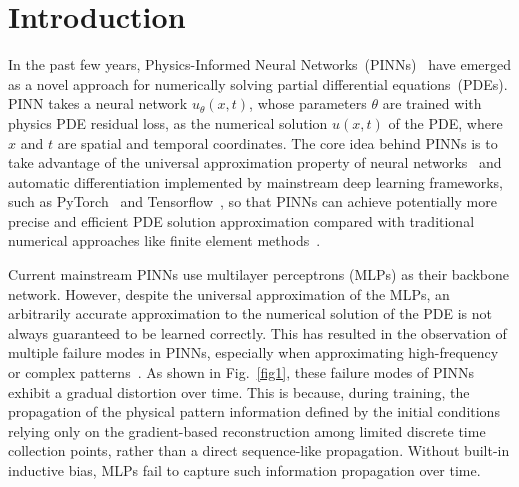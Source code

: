 \section{Introduction}

In the past few years, Physics-Informed Neural Networks~(PINNs)~\cite{raissi2019physics} have emerged as a novel approach for numerically solving partial differential equations~(PDEs). 
    PINN takes a neural network $u_{\theta}(x,t)$, whose parameters $\theta$ are trained with physics PDE residual loss, as the numerical solution $u(x,t)$ of the PDE, where $x$ and $t$ are spatial and temporal coordinates. 
        The core idea behind PINNs is to take advantage of the universal approximation property of neural networks~\cite{hornik1989multilayer} and automatic differentiation implemented by mainstream deep learning frameworks, such as PyTorch~\cite{paszke2019pytorch} and Tensorflow~\cite{abadi2016tensorflow}, 
            so that PINNs can achieve potentially more precise and efficient PDE solution approximation compared with traditional numerical approaches like finite element methods~\cite{reddy1993introduction}.

Current mainstream PINNs use multilayer perceptrons (MLPs) as their backbone network. 
    However, despite the universal approximation of the MLPs, an arbitrarily accurate approximation to the numerical solution of the PDE is not always guaranteed to be learned correctly. 
This has resulted in the observation of multiple failure modes in PINNs, especially when approximating high-frequency or complex patterns~\cite{krishnapriyan2021characterizing}.
As shown in Fig.~\ref{fig1}, these failure modes of PINNs exhibit a gradual distortion over time. 
    This is because, during training, the propagation of the physical pattern information defined by the initial conditions relying only on the gradient-based reconstruction among limited discrete time collection points, rather than a direct sequence-like propagation. 
        Without built-in inductive bias, MLPs fail to capture such information propagation over time.

    





